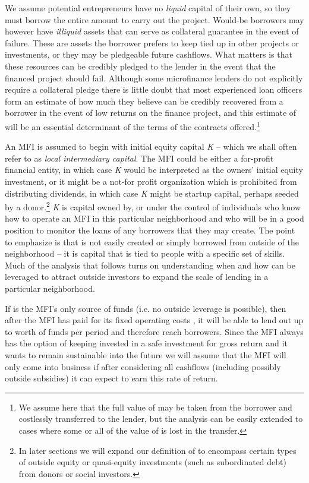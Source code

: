 \documentclass{article}
\begin{document}
We assume potential entrepreneurs have no \emph{liquid} capital of their
own, so they must borrow the entire amount to carry out the project.
Would-be borrowers may however have \emph{illiquid} assets that can
serve as collateral guarantee in the event of failure. These are assets
the borrower prefers to keep tied up in other projects or investments,
or they may be pledgeable future cashflows. What matters is that these
resources can be credibly pledged to the lender in the event that the
financed project should fail. Although some microfinance lenders do not
explicitly require a collateral pledge there is little doubt that most
experienced loan officers form an estimate of how much they believe can
be credibly recovered from a borrower in the event of low returns on the
finance project, and this estimate of will be an essential determinant
of the terms of the contracts offered.\footnote{We assume here that the
  full value of may be taken from the borrower and costlessly
  transferred to the lender, but the analysis can be easily extended to
  cases where some or all of the value of is lost in the transfer.}

An MFI is assumed to begin with initial equity capital \emph{K} -- which
we shall often refer to as \emph{local intermediary capital}. The MFI
could be either a for-profit financial entity, in which case \emph{K}
would be interpreted as the owners' initial equity investment, or it
might be a not-for profit organization which is prohibited from
distributing dividends, in which case \emph{K} might be startup capital,
perhaps seeded by a donor.\footnote{In later sections we will expand our
  definition of to encompass certain types of outside equity or
  quasi-equity investments (such as subordinated debt) from donors or
  social investors.} \emph{K} is capital owned by, or under the control
of individuals who know how to operate an MFI in this particular
neighborhood and who will be in a good position to monitor the loans of
any borrowers that they may create. The point to emphasize is that is
not easily created or simply borrowed from outside of the neighborhood
-- it is capital that is tied to people with a specific set of skills.
Much of the analysis that follows turns on understanding when and how
can be leveraged to attract outside investors to expand the scale of
lending in a particular neighborhood.

If is the MFI's only source of funds (i.e. no outside leverage is
possible), then after the MFI has paid for its fixed operating costs ,
it will be able to lend out up to worth of funds per period and
therefore reach borrowers. Since the MFI always has the option of
keeping invested in a safe investment for gross return and it wants to
remain sustainable into the future we will assume that the MFI will only
come into business if after considering all cashflows (including
possibly outside subsidies) it can expect to earn this rate of return.
\end{document}
